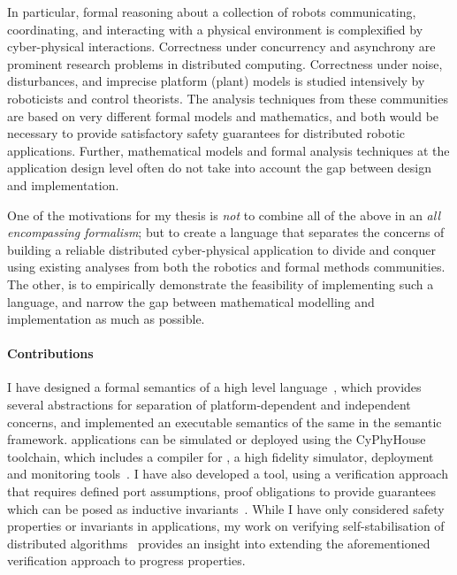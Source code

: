 In particular, formal reasoning about a collection of robots communicating, coordinating, and interacting with a physical environment is complexified by cyber-physical interactions. Correctness under concurrency and asynchrony are prominent research problems in distributed computing. Correctness under noise, disturbances, and imprecise platform (plant) models is studied intensively by roboticists and control theorists. The analysis techniques from these communities are based on very different formal models and mathematics, and both would be necessary  to provide satisfactory safety guarantees for  distributed robotic applications. Further, mathematical models and formal analysis techniques at the application design level often do not take into account the gap between design and implementation. 

One of the motivations for my thesis is {\em not\/} to combine all of the above in an {\em all encompassing formalism\/}; but to create a language that separates the concerns of building a reliable distributed cyber-physical application to divide and conquer using existing analyses from both the robotics and formal methods communities. The other, is to empirically  demonstrate the feasibility of implementing such a language, and narrow the gap between mathematical modelling and implementation as much as possible. 

\paragraph*{Contributions}
I have designed a formal semantics of a high level language~\cite{ghosh_language_2018}, which provides several abstractions for separation of platform-dependent and independent concerns, and implemented an executable semantics of the same in the \K semantic framework. \lgname applications can be simulated or deployed using the CyPhyHouse toolchain, which includes a compiler for \lgname, a high fidelity simulator, deployment and monitoring tools~\cite{ghosh2019cyphyhouse}. I have also developed a tool, using a verification approach that requires defined port assumptions, proof
obligations to provide guarantees which can be posed as inductive invariants~\cite{pldisub}. While I have only considered safety properties or invariants in \lgname applications, my work on verifying self-stabilisation of distributed algorithms~\cite{ghoshforte2015} provides an insight into extending the aforementioned verification approach to progress properties.








